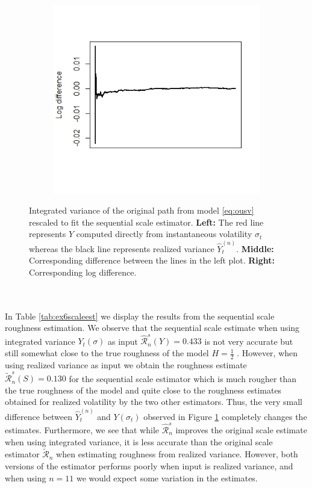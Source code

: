 \documentclass{article}
\begin{document}
\begin{figure}[h]
\begin{subfigure}{0.32\textwidth}
    \end{subfigure}\hfill
    \begin{subfigure}{0.32\textwidth}
        \centering
        \includegraphics[width=\textwidth]{ex6_scale3.jpeg}
    \end{subfigure}
    \caption{Integrated variance of the original path from model \eqref{eq:ousv} rescaled to fit the sequential scale estimator. \textbf{Left:} The red line represents $Y$ computed directly from instantaneous volatility $\sigma_t$ whereas the black line represents realized variance $\hat{Y}_t^{(n)}$. \textbf{Middle:} Corresponding difference between the lines in the left plot. \textbf{Right:} Corresponding log difference.}
    \label{fig:ex6scale}
\end{figure}\\\\
In Table \ref{tab:ex6scaleest} we display the results from the sequential scale roughness estimation. We observe that the sequential scale estimate when using integrated variance $Y_t(\sigma)$ as input $\widehat{\mathscr{R}}_n^s(Y)=0.433$ is not very accurate but still somewhat close to the true roughness of the model $H=\frac{1}{2}$ . However, when using realized variance as input we obtain the roughness estimate $\widetilde{\mathscr{R}}_n^s (S) = 0.130$ for the sequential scale estimator which is much rougher than the true roughness of the model and quite close to the roughness estimates obtained for realized volatility by the two other estimators. Thus, the very small difference between $\hat{Y}_t^{(n)}$ and $Y(\sigma_t)$ observed in Figure \ref{fig:ex6scale} completely changes the estimates. Furthermore, we see that while $\widehat{\mathscr{R}}_n^s$ improves the original scale estimate when using integrated variance, it is less accurate than the original scale estimator $\widetilde{\mathscr{R}}_n$ when estimating roughness from realized variance. However, both versions of the estimator performs poorly when input is realized variance, and when using $n=11$ we would expect some variation in the estimates.
\end{document}
